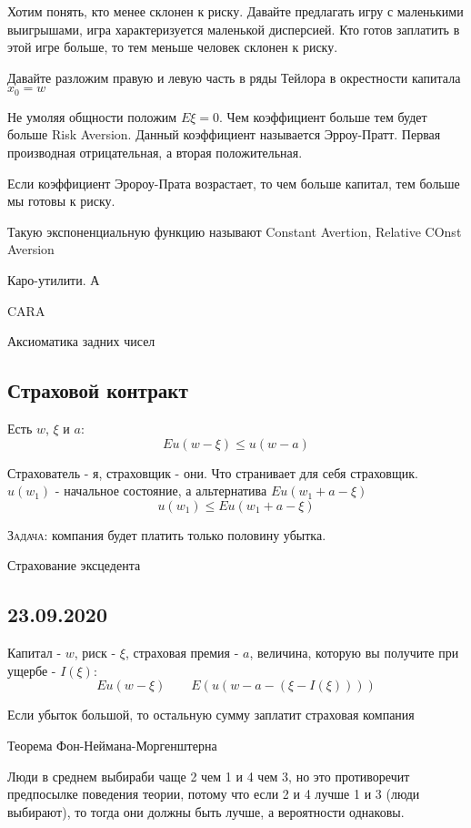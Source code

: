 \documentclass[%
12pt, %
final, %
oneside, %
onecolumn, %
centertags]{article} %
\theoremstyle{plain}
\theoremstyle{definition}
\theoremstyle{remark}
\begin{document}
Хотим понять, кто менее склонен к риску. Давайте предлагать игру с маленькими выигрышами, игра характеризуется маленькой дисперсией. Кто готов заплатить в этой игре больше, то тем меньше человек склонен к риску.

Давайте разложим правую и левую часть в ряды Тейлора в окрестности капитала $x_0 = w$

Не умоляя общности положим $E\xi = 0$. Чем коэффициент больше тем будет больше Risk Aversion. Данный коэффициент называется Эрроу-Пратт. Первая производная отрицательная, а вторая положительная.

Если коэффициент Эророу-Прата возрастает, то чем больше капитал, тем больше мы готовы к риску.

Такую экспоненциальную функцию называют Constant Avertion, Relative COnst Aversion

Каро-утилити. А

CARA

Аксиоматика задних чисел

\subsection{Страховой контракт}

Есть $w$, $\xi$ и $a$:
$$Eu(w-\xi) \leqslant u(w-a)$$

Страхователь - я, страховщик - они. Что странивает для себя страховщик. $u(w_1)$ - начальное состояние, а альтернатива $Eu(w_1+a-\xi)$
$$u(w_1) \leqslant Eu(w_1+a-\xi)$$

\textsc{Задача:} компания будет платить только половину убытка.

Страхование эксцедента 

\subsection{23.09.2020}

Капитал - $w$, риск - $\xi$, страховая премия - $a$, величина, которую вы получите при ущербе - $I(\xi)$:
$$Eu(w-\xi) \qquad E(u(w-a-(\xi - I(\xi))))$$

Если убыток большой, то остальную сумму заплатит страховая компания

Теорема Фон-Неймана-Моргенштерна

Люди в среднем выбираби чаще 2 чем 1 и 4 чем 3, но это противоречит предпосылке поведения теории, потому что если 2 и 4 лучше 1 и 3 (люди выбирают), то тогда они должны быть лучше, а вероятности однаковы.
\end{document}
